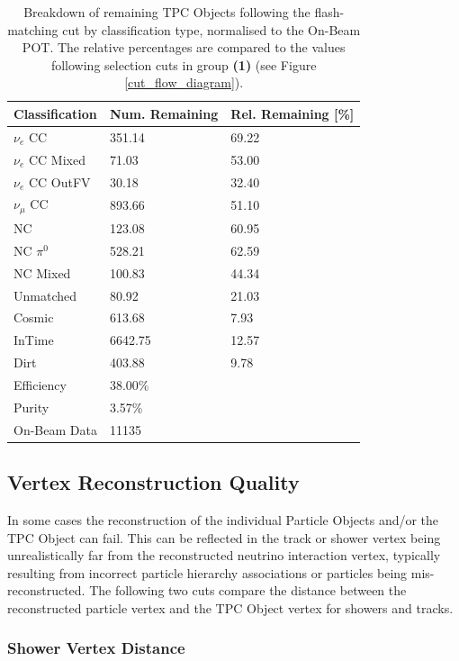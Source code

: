\begin{table}[htbp]
\center
\begin{tabular}{l | l l }
Classification & Num. Remaining & Rel. Remaining [\%] \\
\hline
$\nu_e$ CC & 351.14 & 69.22\\
$\nu_e$ CC Mixed & 71.03 & 53.00\\
$\nu_e$ CC OutFV & 30.18 & 32.40\\
$\nu_{\mu}$ CC & 893.66 & 51.10\\
NC & 123.08 & 60.95\\
NC $\pi^0$ & 528.21 & 62.59\\
NC Mixed & 100.83 & 44.34\\
Unmatched & 80.92 & 21.03\\
Cosmic & 613.68 & 7.93\\
InTime & 6642.75 & 12.57\\
Dirt & 403.88 & 9.78\\
\hline
\hline
Efficiency & 38.00\%\\
Purity & 3.57\%\\
\hline
On-Beam Data & 11135\\
\hline
\end{tabular}
\caption{Breakdown of remaining TPC Objects following the flash-matching cut by classification type, normalised to the On-Beam POT. The relative percentages are compared to the values following selection cuts in group \textbf{(1)} (see Figure \ref{cut_flow_diagram}).}\label{selection_summary_table_flash_to_vtx}
\end{table}

\FloatBarrier
\subsection{Vertex Reconstruction Quality}

In some cases the reconstruction of the individual Particle Objects and/or the TPC Object can fail. This can be reflected in the track or shower vertex being unrealistically far from the reconstructed neutrino interaction vertex, typically resulting from incorrect particle hierarchy associations or particles being mis-reconstructed. The following two cuts compare the distance between the reconstructed particle vertex and the TPC Object vertex for showers and tracks.

\subsubsection{Shower Vertex Distance}\label{section_shower_vertex_cut}


